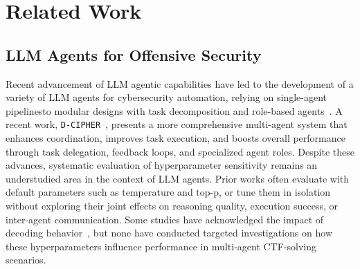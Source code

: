 \section{Related Work}

\subsection{LLM Agents for Offensive Security}
Recent advancement of LLM agentic capabilities have led to the development of a variety of LLM agents for cybersecurity automation, relying on single-agent pipelinesto modular designs with task decomposition and role-based agents~\cite{guo2024largelanguagemodelbased,song2024audit,saha2025malgen,liu2024multi,bianou2024pentestmitre,dorri2018multi, abramovich2024enigma}. A recent work, \texttt{D-CIPHER}~\cite{udeshi2025d}, presents a more comprehensive multi-agent system that enhances coordination, improves task execution, and boosts overall performance through task delegation, feedback loops, and specialized agent roles.
Despite these advances, systematic evaluation of hyperparameter sensitivity remains an understudied area in the context of LLM agents. Prior works often evaluate with default parameters such as temperature and top-p, or tune them in isolation without exploring their joint effects on reasoning quality, execution success, or inter-agent communication. Some studies have acknowledged the impact of decoding behavior~\cite{turtayev2024hacking,yang2023intercode,yao2022react}, but none have conducted targeted investigations on how these hyperparameters influence performance in multi-agent CTF-solving scenarios. 

